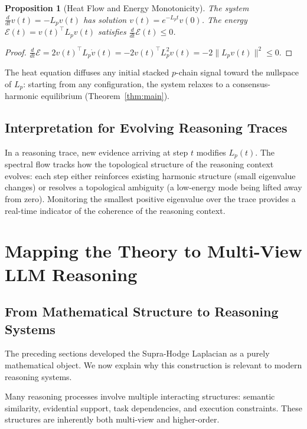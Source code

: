\documentclass[11pt]{article}
\newtheorem{proposition}[theorem]{Proposition}
\theoremstyle{definition}
\theoremstyle{remark}
\begin{document}
\begin{proposition}[Heat Flow and Energy Monotonicity]
\label{prop:heat}
The system $\frac{d}{dt}v(t) = -L_p v(t)$ has solution $v(t)=e^{-L_p t}v(0)$.
The energy $\mathcal{E}(t) = v(t)^\top L_p v(t)$ satisfies
$\frac{d}{dt}\mathcal{E}(t) \leq 0$.
\end{proposition}

\begin{proof}
$\frac{d}{dt}\mathcal{E} = 2v(t)^\top L_p\dot{v}(t) = -2v(t)^\top L_p^2
v(t) = -2\|L_p v(t)\|^2 \leq 0$.
\end{proof}

The heat equation diffuses any initial stacked $p$-chain signal toward the nullspace of $L_p$:
starting from any configuration, the system relaxes to a consensus-harmonic
equilibrium (Theorem~\ref{thm:main}).

\subsection{Interpretation for Evolving Reasoning Traces}

In a reasoning trace, new evidence arriving at step $t$ modifies $L_p(t)$. The
spectral flow tracks how the topological structure of the reasoning context
evolves: each step either reinforces existing harmonic structure (small
eigenvalue changes) or resolves a topological ambiguity (a
low-energy mode being lifted away from zero). Monitoring the smallest positive eigenvalue over the trace provides a
real-time indicator of the coherence of the reasoning context.


\section{Mapping the Theory to Multi-View LLM Reasoning}
\label{sec:application}

\subsection{From Mathematical Structure to Reasoning Systems}

The preceding sections developed the Supra-Hodge Laplacian as a purely mathematical object. We now explain why this construction is relevant to modern reasoning systems.

Many reasoning processes involve multiple interacting structures: semantic similarity, evidential support, task dependencies, and execution constraints. These structures are inherently both multi-view and higher-order.
\end{document}
